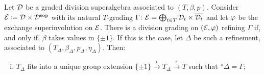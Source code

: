 \begin{thm}\label{thm:refinement-DxDsop}
    Let $\mathcal{D}$ be a graded division superalgebra associated to $(T, \beta, p)$.  
    Consider $\mathcal E \coloneqq \mathcal{D} \times \mathcal{D}^{\mathrm{sop}}$ with its natural $T$-grading $\Gamma\colon \mathcal E = \bigoplus_{t\in T} \mathcal{D}_t \times \overline{\mathcal{D}_t}$ and let $\varphi$ be the exchange superinvolution on $\mathcal E$. 
    There is a division grading on $(\mathcal E, \varphi)$ refining $\Gamma$ if, and only if, $\beta$ takes values in $\{ \pm 1 \}$. 
    If this is the case, let $\Delta$ be such a refinement, associated to $(T_\Delta, \beta_\Delta, p_\Delta, \eta_\Delta)$. 
    Then: %
    \begin{enumerate}[(i)]
        
        \item %
        $T_\Delta$ fits into a unique group extension $\{ \pm 1 \} \xrightarrow{\iota} T_\Delta \xrightarrow{\pi} T$ such that ${}^{\pi} \Delta = \Gamma$; \label{item:there-is-extension}
        

\end{enumerate}
\end{thm}
